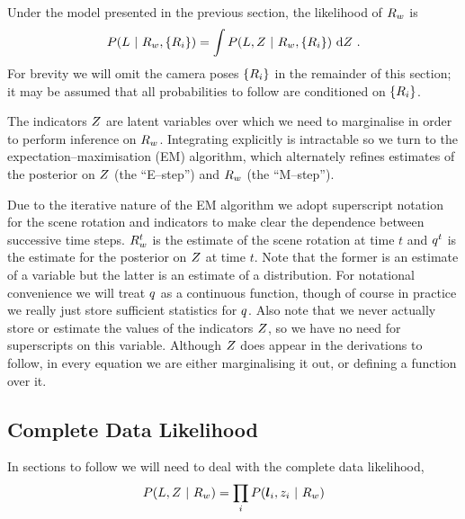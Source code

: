 Under the model presented in the previous section, the
likelihood of $\SceneR$ is
\begin{equation}
  P(\LineSegs ~|~ \SceneR,\{\CamR_i\}) =
  \int P(\LineSegs,\Indicators ~|~ \SceneR,\{\CamR_i\})
  ~\intd\Indicators ~.
\end{equation}
For brevity we will omit the camera poses $\{\CamR_i\}$ in the
remainder of this section; it may be assumed that all probabilities
to follow are conditioned on $\{\CamR_i\}$.

The indicators $\Indicators$ are latent variables over which we need
to marginalise in order to perform inference on $\SceneR$. Integrating
explicitly is intractable so we turn to the
expectation--maximisation (EM) algorithm, which alternately refines
estimates of the posterior on $\Indicators$ (the ``E--step'') and
$\SceneR$ (the ``M--step'').

Due to the iterative nature of the EM algorithm we adopt superscript
notation for the scene rotation and indicators to make clear the
dependence between successive time steps. $\SceneR^t$ is the estimate
of the scene rotation at time $t$ and $\PosteriorEst^t$ is the
estimate for the posterior on $\Indicators$ at time $t$. Note that the
former is an estimate of a variable but the latter is an estimate of a
distribution. For notational convenience we will treat $\PosteriorEst$
as a continuous function, though of course in practice we really just
store sufficient statistics for $\PosteriorEst$. Also note that we
never actually store or estimate the values of the indicators
$\Indicators$, so we have no need for superscripts on this
variable. Although $\Indicators$ does appear in the derivations to
follow, in every equation we are either marginalising it out, or
defining a function over it.

\subsection{Complete Data Likelihood}

In sections to follow we will need to deal with the complete data
likelihood,
\begin{equation}
  P(\LineSegs,\Indicators ~|~ \SceneR) =
  \prod_i P(\LineSeg_i,\Indicator_i ~|~ \SceneR)
\end{equation}

